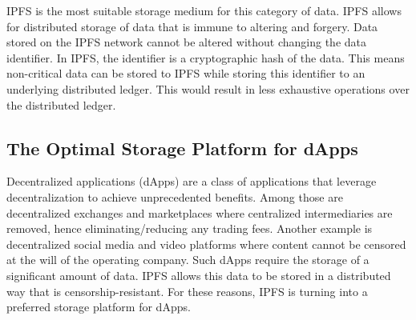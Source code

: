 IPFS is the most suitable storage medium for this category of data. IPFS allows for distributed storage of data that is immune to altering and forgery. Data stored on the IPFS network cannot be altered without changing the data identifier. In IPFS, the identifier is a cryptographic hash of the data. This means non-critical data can be stored to IPFS while storing this identifier to an underlying distributed ledger. This would result in less exhaustive operations over the distributed ledger. \\[-8pt]

\subsection{The Optimal Storage Platform for dApps}

Decentralized applications (dApps) are a class of applications that leverage decentralization to achieve unprecedented benefits. Among those are decentralized exchanges and marketplaces where centralized intermediaries are removed, hence eliminating/reducing any trading fees. Another example is decentralized social media and video platforms where content cannot be censored at the will of the operating company. Such dApps require the storage of a significant amount of data. IPFS allows this data to be stored in a distributed way that is censorship-resistant. For these reasons, IPFS is turning into a preferred storage platform for dApps.